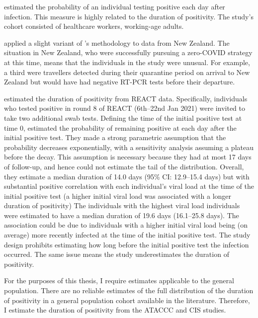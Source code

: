 \documentclass[thesis.tex]{subfiles}
\begin{document}
\Textcite{hellewellPCRSensitivity} estimated the probability of an individual testing positive each day after infection.
This measure is highly related to the duration of positivity.
The study's cohort consisted of healthcare workers, \ie working-age adults.

\Textcite{binnySensitivity} applied a slight variant of \textcite{hellewellPCRSensitivity}'s methodology to data from New Zealand.
The situation in New Zealand, who were successfully pursuing a zero-COVID strategy at this time, means that the individuals in the study were unusual.
For example, a third were travellers detected during their quarantine period on arrival to New Zealand but would have had negative RT-PCR tests before their departure.

\Textcite{ealesCharacterising} estimated the duration of positivity from REACT data.
Specifically, individuals who tested positive in round 8 of REACT (6th--22nd Jan 2021) were invited to take two additional swab tests.
Defining the time of the initial positive test at time 0, \textcite{ealesCharacterising} estimated the probability of remaining positive at each day after the initial positive test.
They made a strong parametric assumption that the probability decreases exponentially, with a sensitivity analysis assuming a plateau before the decay.
This assumption is necessary because they had at most 17 days of follow-up, and hence could not estimate the tail of the distribution.
Overall, they estimate a median duration of 14.0 days (95\% CI: 12.9--15.4 days) but with substantial positive correlation with each individual’s viral load at the time of the initial positive test (\ie a higher initial viral load was associated with a longer duration of positivity)
The individuals with the highest viral load individuals were estimated to have a median duration of 19.6 days (16.1--25.8 days).
The association could be due to individuals with a higher initial viral load being (on average) more recently infected at the time of the initial positive test.
The study design prohibits estimating how long before the initial positive test the infection occurred.
The same issue means the study underestimates the duration of positivity.

For the purposes of this thesis, I require estimates applicable to the general population.
There are no reliable estimates of the full distribution of the duration of positivity in a general population cohort available in the literature.
Therefore, I estimate the duration of positivity from the ATACCC and CIS studies.
\end{document}
